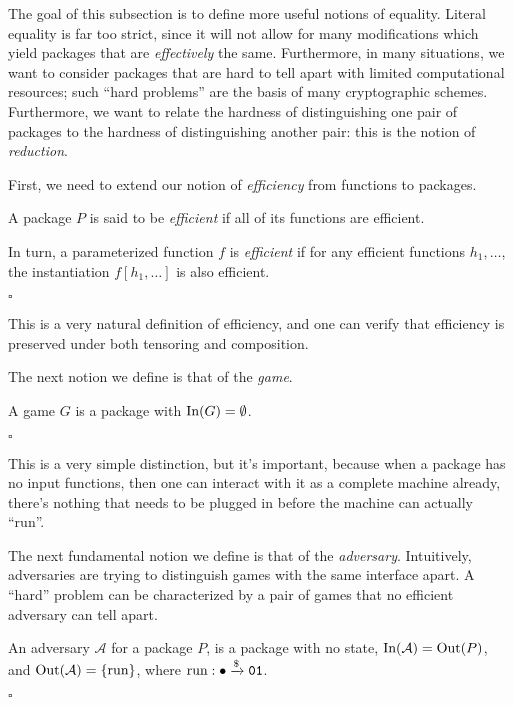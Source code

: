 The goal of this subsection is to define more useful notions of equality.
Literal equality is far too strict, since it will not allow
for many modifications which yield packages that are \emph{effectively}
the same.
Furthermore, in many situations, we want to consider packages
that are hard to tell apart with limited computational resources;
such ``hard problems'' are the basis of many cryptographic schemes.
Furthermore, we want to relate the hardness of distinguishing
one pair of packages to the hardness of distinguishing another pair:
this is the notion of \emph{reduction}.

First, we need to extend our notion of \emph{efficiency}
from functions to packages.

\begin{definition}
    A package $P$ is said to be \emph{efficient} if all of its
    functions are efficient.

    In turn, a parameterized function $f$ is \emph{efficient}
    if for any efficient functions $h_1, \ldots$, the instantiation
    $f[h_1, \ldots]$ is also efficient.

    $\square$
\end{definition}

This is a very natural definition of efficiency,
and one can verify that efficiency is preserved under both
tensoring and composition.

The next notion we define is that of the \emph{game}.
\begin{definition}[Game]
    A game $G$ is a package with $\text{In}(G) = \emptyset$.

    $\square$
\end{definition}

This is a very simple distinction, but it's important,
because when a package has no input functions, then one can interact
with it as a complete machine already, there's nothing that needs
to be plugged in before the machine can actually ``run''.

The next fundamental notion we define is that of the \emph{adversary}.
Intuitively, adversaries are trying to distinguish games with the same
interface apart.
A ``hard'' problem can be characterized by a pair of games that
no efficient adversary can tell apart.

\begin{definition}[Adversaries]
    An adversary $\mathcal{A}$ for a package $P$, is a package
    with no state, $\text{In}(\mathcal{A}) = \text{Out}(P)$, and $\text{Out}(\mathcal{A}) = \{\text{run}\}$,
    where $\text{run} : \bullet \xrightarrow{\$} \texttt{01}$.

    $\square$
\end{definition}

